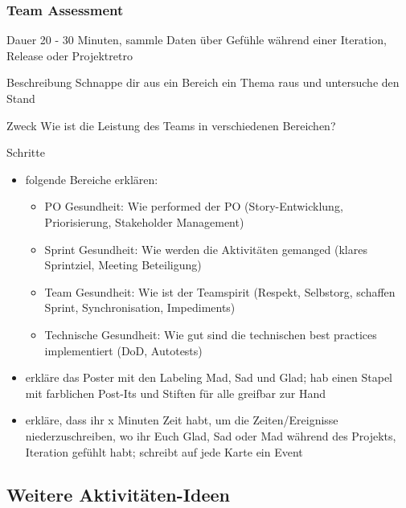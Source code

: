 \subsubsection{Team Assessment}
\begin{Beschreibungfett}[Beschreibung]
  \item [Dauer] 20 - 30 Minuten, sammle Daten über Gefühle während einer Iteration,
    Release oder Projektretro
  \item [Beschreibung] Schnappe dir aus ein Bereich ein Thema raus und untersuche den Stand
  \item [Zweck] Wie ist die Leistung des Teams in verschiedenen Bereichen?
  \item [Schritte]
    \begin{itemize}
      \item folgende Bereiche erklären:
        \begin{itemize}
          \item PO Gesundheit: Wie performed der PO (Story-Entwicklung, Priorisierung, Stakeholder
            Management)
          \item Sprint Gesundheit: Wie werden die Aktivitäten gemanged (klares Sprintziel, Meeting
            Beteiligung)
          \item Team Gesundheit: Wie ist der Teamspirit (Respekt, Selbstorg, schaffen Sprint,
            Synchronisation, Impediments)
          \item Technische Gesundheit: Wie gut sind die technischen best practices implementiert
            (DoD, Autotests)
        \end{itemize}
      \item erkläre das Poster mit den Labeling Mad, Sad und Glad; hab einen Stapel mit
        farblichen Post-Its und Stiften für alle greifbar zur Hand
      \item erkläre, dass ihr x Minuten Zeit habt, um die Zeiten/Ereignisse niederzuschreiben, wo
        ihr Euch Glad, Sad oder Mad während des Projekts, Iteration gefühlt habt; schreibt auf jede Karte ein Event
    \end{itemize}
\end{Beschreibungfett}


\subsection{Weitere Aktivitäten-Ideen}
